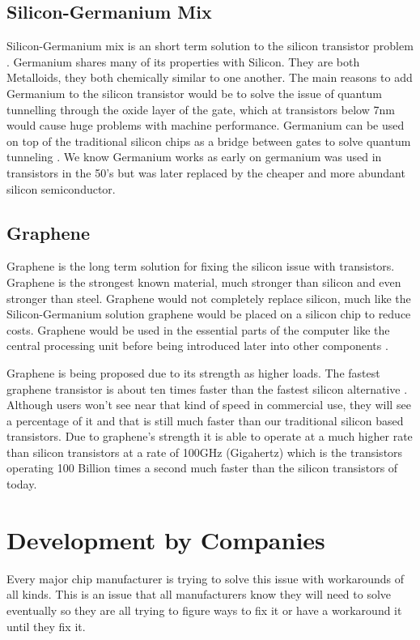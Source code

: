 \documentclass[journal]{IEEEtran}
\begin{document}
\subsection{Silicon-Germanium Mix}
Silicon-Germanium mix is an short term solution to the silicon transistor problem \cite{8947469320180101}. Germanium shares many of its properties with Silicon. They are both Metalloids, they both chemically similar to one another. The main reasons to add Germanium to the silicon transistor would be to solve the issue of quantum tunnelling through the oxide layer of the gate, which at transistors below 7nm would cause huge problems with machine performance. Germanium can be used on top of the traditional silicon chips as a bridge between gates to solve quantum tunneling \cite{ye_2016}. We know Germanium works as early on germanium was used in transistors in the 50's but was later replaced by the cheaper and more abundant silicon semiconductor. 

\subsection{Graphene}
Graphene is the long term solution for fixing the silicon issue with transistors. Graphene is the strongest known material, much stronger than silicon and even stronger than steel. Graphene would not completely replace silicon, much like the Silicon-Germanium solution graphene would be placed on a silicon chip to reduce costs. Graphene would be used in the essential parts of the computer like the central processing unit before being introduced later into other components \cite{48600520130101}.

Graphene is being proposed due to its strength as higher loads. The fastest graphene transistor is about ten times faster than the fastest silicon alternative \cite{bourzac_2010}. Although users won't see near that kind of speed in commercial use, they will see a percentage of it and that is still much faster than our traditional silicon based transistors. Due to graphene's strength it is able to operate at a much higher rate than silicon transistors at a rate of 100GHz (Gigahertz) which is the transistors operating 100 Billion times a second much faster than the silicon transistors of today. 

\section{Development by Companies}
Every major chip manufacturer is trying to solve this issue with workarounds of all kinds. This is an issue that all manufacturers know they will need to solve eventually so they are all trying to figure ways to fix it or have a workaround it until they fix it.
\end{document}
